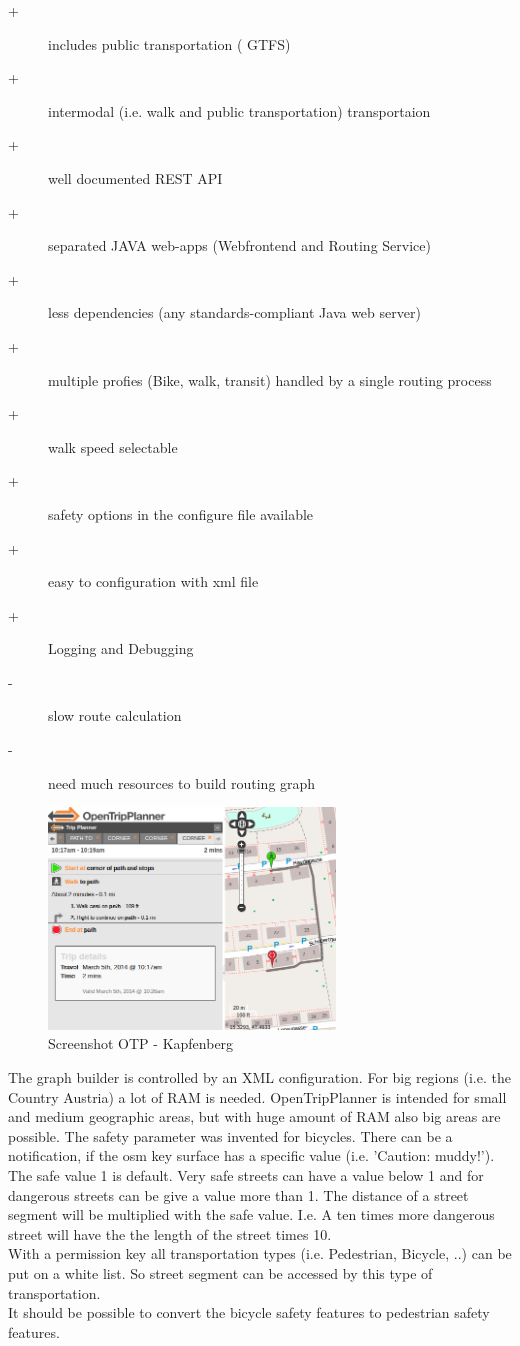 \documentclass{sig-alternate}
\begin{document}
\begin{description}
  \item[+] includes public transportation ( GTFS)
  \item[+] intermodal (i.e. walk and public transportation) transportaion
  \item[+] well documented REST API
  \item[+] separated JAVA web-apps (Webfrontend and Routing Service)
  \item[+] less dependencies (any standards-compliant Java web server)
  \item[+] multiple profies (Bike, walk, transit) handled by a single routing process
  \item[+] walk speed selectable
  \item[+] safety options in the configure file available
  \item[+] easy to configuration with xml file
  \item[+] Logging and Debugging 
  \item[-] slow route calculation
  \item[-] need much resources to build routing graph   
\end{description} 
 
\begin{figure}
\centering
\includegraphics[width=3in]{otp-ss.png}
\caption{Screenshot OTP - Kapfenberg}
\label{fig:otp}
\end{figure}
 
 The graph builder is controlled by an XML configuration. For big regions (i.e. the Country Austria) a lot of RAM is needed. OpenTripPlanner is intended for small and medium geographic areas, but with huge amount of RAM also big areas are possible. The safety parameter was invented for bicycles. There can be a notification, if the osm key surface  has a specific value (i.e. 'Caution: muddy!'). The safe value 1 is default. Very safe streets can have a value below 1 and for dangerous streets can be give a value more than 1. The distance of a street segment will be multiplied with the safe value. I.e. A ten times more dangerous street will have the the length of the street times 10. \\
 With a permission key all transportation types (i.e. Pedestrian, Bicycle, ..) can be put on a white list. So street segment can be accessed by this type of transportation. \\
 It should be possible to convert the bicycle safety features to pedestrian safety features.
 
\end{document}

